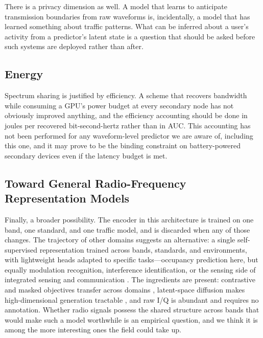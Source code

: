 \documentclass[lettersize,journal]{IEEEtran}
\begin{document}
There is a privacy dimension as well. A model that learns to anticipate
transmission boundaries from raw waveforms is, incidentally, a model
that has learned something about traffic patterns. What can be inferred
about a user's activity from a predictor's latent state is a question
that should be asked before such systems are deployed rather than after.

\subsection{\textbf{Energy}}
Spectrum sharing is justified by efficiency. A scheme that recovers
bandwidth while consuming a GPU's power budget at every secondary node
has not obviously improved anything, and the efficiency accounting should
be done in joules per recovered bit-second-hertz rather than in AUC.
This accounting has not been performed for any waveform-level predictor
we are aware of, including this one, and it may prove to be the binding
constraint on battery-powered secondary devices even if the latency
budget is met.

\subsection{\textbf{Toward General Radio-Frequency Representation Models}}
Finally, a broader possibility. The encoder in this architecture is
trained on one band, one standard, and one traffic model, and is
discarded when any of those changes. The trajectory of other domains
suggests an alternative: a single self-supervised representation trained
across bands, standards, and environments, with lightweight heads
adapted to specific tasks---occupancy prediction here, but equally
modulation recognition, interference identification, or the sensing side
of integrated sensing and communication \cite{Liu2022ISAC}. The
ingredients are present: contrastive and masked objectives transfer
across domains \cite{Oord2018,Chen2020}, latent-space diffusion makes
high-dimensional generation tractable \cite{Rombach2022}, and raw I/Q is
abundant and requires no annotation. Whether radio signals possess the
shared structure across bands that would make such a model worthwhile is
an empirical question, and we think it is among the more interesting
ones the field could take up.
\end{document}

